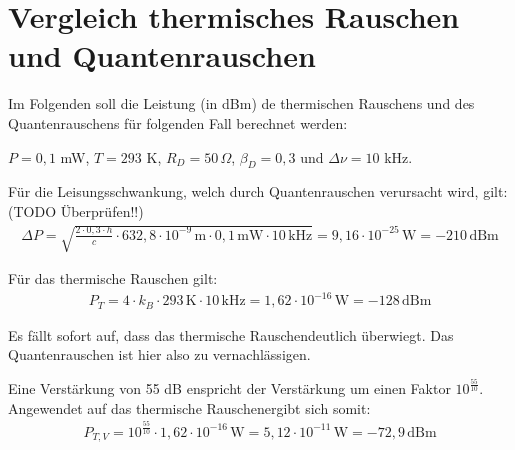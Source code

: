 
\section{Vergleich thermisches Rauschen und Quantenrauschen}

Im Folgenden soll die Leistung (in dBm) de thermischen Rauschens und des Quantenrauschens für folgenden Fall berechnet werden:

$P = 0,1$ mW, $T = 293$ K, $R_D = 50\, \Omega$, $\beta_D = 0,3$ und $\Delta \nu = 10$ kHz.

Für die Leisungsschwankung, welch durch Quantenrauschen verursacht wird, gilt: (TODO Überprüfen!!)
\begin{gather}
    \Delta P = \sqrt{\frac{2\cdot0,3\cdot h}{c}\cdot 632,8 \cdot 10^{-9}\,\text{m} \cdot 0,1\, \text{mW} \cdot 10 \, \text{kHz}} = 9,16 \cdot 10^{-25}\, \text{W} = -210\, \text{dBm}
\end{gather}

Für das thermische Rauschen gilt:
\begin{gather}
    P_T = 4 \cdot k_B \cdot 293\,\text{K} \cdot 10\,\text{kHz} = 1,62 \cdot 10^{-16}\, \text{W} = -128 \, \text{dBm}
\end{gather}

Es fällt sofort auf, dass das thermische Rauschendeutlich überwiegt. Das Quantenrauschen ist hier also zu vernachlässigen.

Eine Verstärkung von 55 dB enspricht der Verstärkung um einen Faktor $ 10^{\frac{55}{10}}$.
Angewendet auf das thermische Rauschenergibt sich somit:
\begin{gather}
    P_{T,V} = 10^{\frac{55}{10}} \cdot 1,62 \cdot 10^{-16}\, \text{W} = 5,12 \cdot 10^{-11}\, \text{W} = -72,9 \, \text{dBm}
\end{gather}